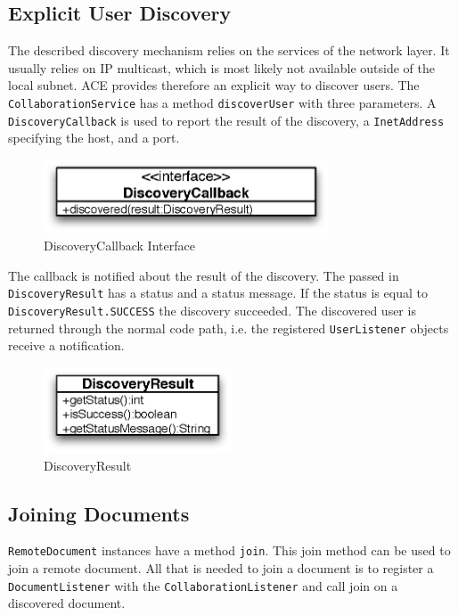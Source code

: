 \subsection{Explicit User Discovery}
The described discovery mechanism relies on the services of the network layer.
It usually relies on IP multicast, which is most likely not available outside
of the local subnet. ACE provides therefore an explicit way to discover users.
The \texttt{CollaborationService} has a method \texttt{discoverUser} with
three parameters. A \texttt{DiscoveryCallback} is used to report the result
of the discovery, a \texttt{InetAddress} specifying the host, and a port.

\begin{figure}[H]
 \centering
 \includegraphics[width=8.47cm,height=2.19cm]{../images/finalreport/architecture_discoverycallback_uml.eps}
 \caption{DiscoveryCallback Interface}
\end{figure}

The callback is notified about the result of the discovery. The passed in
\texttt{DiscoveryResult} has a status and a status message. If the status
is equal to \texttt{DiscoveryResult.SUCCESS} the discovery succeeded. The
discovered user is returned through the normal code path, i.e. the
registered \texttt{UserListener} objects receive a notification.

\begin{figure}[H]
 \centering
 \includegraphics[width=5.57cm,height=2.54cm]{../images/finalreport/architecture_discoveryresult_uml.eps}
 \caption{DiscoveryResult}
\end{figure}


\subsection{Joining Documents}
\label{sect:archoverview.join}
\texttt{RemoteDocument} instances have a method \texttt{join}. This join
method can be used to join a remote document. All that is needed to
join a document is to register a \texttt{DocumentListener} with the 
\texttt{CollaborationListener} and call join on a discovered document.

